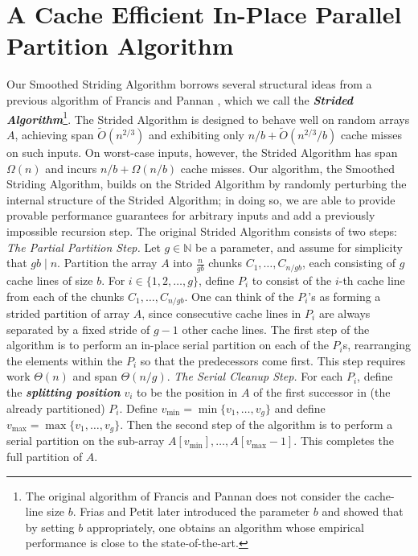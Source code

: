 \documentclass[sigconf]{acmart}
\newcommand{\defn}[1]{{\textit{\textbf{\boldmath #1}}}}
\renewcommand{\paragraph}[1]{\vspace{0.09in}\noindent{\bf \boldmath #1.}}
\theoremstyle{remark}
\theoremstyle{remark}
\begin{document}
\section{A Cache Efficient In-Place Parallel Partition Algorithm}\label{sec:smoothing}

\paragraph{The Strided Algorithm \cite{FrancisPa92}}
Our Smoothed Striding Algorithm borrows several structural ideas from a
previous algorithm of Francis and Pannan \cite{FrancisPa92}, which we call the
\defn{Strided Algorithm}\footnote{The original algorithm of Francis and Pannan
  \cite{FrancisPa92} does not consider the cache-line size $b$. Frias and Petit
later introduced the parameter $b$ \cite{Frias08} and showed that by setting
$b$ appropriately, one obtains an algorithm whose empirical performance is
close to the state-of-the-art.}. The Strided Algorithm is designed to behave
well on random arrays $A$, achieving span $\tilde{O}(n^{2/3})$ and exhibiting
only $n/b + \tilde{O}(n^{2/3} / b)$  cache misses on such inputs. On worst-case
inputs, however, the Strided Algorithm has span $\Omega(n)$ and incurs $n/b +
\Omega(n/b)$ cache misses. Our algorithm, the Smoothed Striding Algorithm,
builds on the Strided Algorithm by randomly perturbing the internal structure
of the Strided Algorithm; in doing so, we are able to provide provable
performance guarantees for arbitrary inputs and add a previously impossible
recursion step.
The original Strided Algorithm consists of two steps: \\
\emph{The Partial Partition Step.} 
Let $g \in \mathbb{N}$ be a
parameter, and assume for simplicity that $gb \mid n$. Partition the
array $A$ into $\frac{n}{gb}$ chunks $C_1, \ldots, C_{n / gb}$,
each consisting of $g$ cache lines of size $b$.
For $i \in \{1, 2, \ldots, g\}$, define 
$P_i$ to consist of the $i$-th cache line from each of the
chunks $C_1, \ldots, C_{n / gb}$. One can think of the $P_i$'s
as forming a strided partition of array $A$, since
consecutive cache lines in $P_i$ are always separated by a fixed
stride of $g - 1$ other cache lines.
The first step of the algorithm is to perform an in-place serial
partition on each of the $P_i$s, rearranging the elements within the
$P_i$ so that the predecessors come first. This step requires work
$\Theta(n)$ and span $\Theta(n/g)$.
\emph{The Serial Cleanup Step. }
For each $P_i$, define the \defn{splitting position} $v_i$ to be the position
in $A$ of the first successor in (the already partitioned) $P_i$. Define
$v_{\text{min}} = \min\{v_1, \ldots, v_{g}\}$ and define $v_{\text{max}} =
\max\{v_1, \ldots, v_{g}\}$. Then the second step of the algorithm is to
perform a serial partition on the sub-array $A[v_{\text{min}}],\ldots,
A[v_{\text{max}}-1]$. This completes the full partition of $A$.
\end{document}
